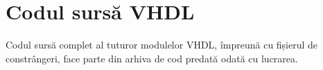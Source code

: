 \appendix
\chapter{Codul sursă VHDL}\label{app:vhdl}
\pagestyle{fancy}

Codul sursă complet al tuturor modulelor VHDL, împreună cu fișierul de constrângeri,
face parte din arhiva de cod predată odată cu lucrarea.

